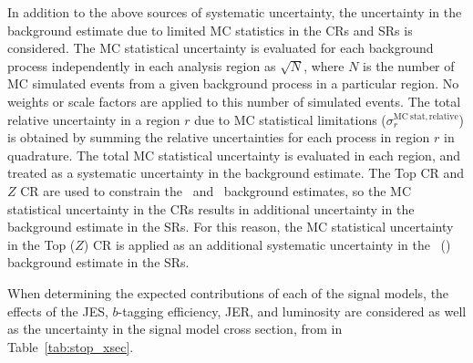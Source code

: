 In addition to the above sources of systematic uncertainty, the uncertainty
in the background estimate due to limited MC statistics in the CRs and SRs is
considered.
The MC statistical uncertainty is evaluated for each background process
independently in each analysis region as
$\sqrt{N}$, where $N$ is the number of MC simulated events from a given
background process in a particular region.
No weights or scale factors are applied to this number of simulated events.
The total relative uncertainty in a region $r$ due to MC statistical
limitations ($\sigma_{r}^\mathrm{MC~stat,relative}$) is obtained by summing the
relative uncertainties for each process in region $r$ in quadrature.
The total MC statistical uncertainty is evaluated in each region, and treated
as a systematic uncertainty in the background estimate.
The Top CR and $Z$ CR are used to constrain the \TTBAR\ and
\ZGAMMAJETS\ background estimates, so the MC statistical uncertainty in the
CRs results in additional uncertainty in the background estimate in the SRs.
For this reason, the MC statistical uncertainty in the Top ($Z$) CR is applied
as an additional systematic uncertainty in the \TTBAR\ (\ZGAMMAJETS) background
estimate in the SRs.

When determining the expected contributions of each of the signal models,
the effects of the JES, $b$-tagging efficiency, JER, and luminosity are
considered as well as the uncertainty in the signal model cross section,
from in Table~\ref{tab:stop_xsec}.

